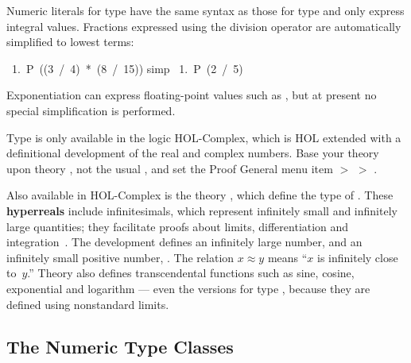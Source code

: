 Numeric literals
for type  have the same syntax as those for type
 and only express integral values.  Fractions expressed
using the division operator are automatically simplified to lowest terms:
\begin{isabelle}
\ 1.\ P\ ((3\ /\ 4)\ *\ (8\ /\ 15))\isanewline
{} simp\isanewline
\ 1.\ P\ (2\ /\ 5)
\end{isabelle}
Exponentiation can express floating-point values such as
, but at present no special simplification
is performed.

\begin{warn}
Type  is only available in the logic HOL-Complex, which is
HOL extended with a definitional development of the real and complex
numbers.  Base your theory upon theory , not the
usual , and set the Proof General menu item  $>$
 $>$ .%
\end{warn}

Also available in HOL-Complex is the
theory , which define the type  of 
.  These
\textbf{hyperreals} include infinitesimals, which represent infinitely
small and infinitely large quantities; they facilitate proofs
about limits, differentiation and integration~\cite{fleuriot-jcm}.  The
development defines an infinitely large number,  and an
infinitely small positive number, .  The 
relation $x\approx y$ means ``$x$ is infinitely close to~$y$.''
Theory  also defines transcendental functions such as sine,
cosine, exponential and logarithm --- even the versions for type
, because they are defined using nonstandard limits.%
%
%


\subsection{The Numeric Type Classes}\label{sec:numeric-axclasses}


